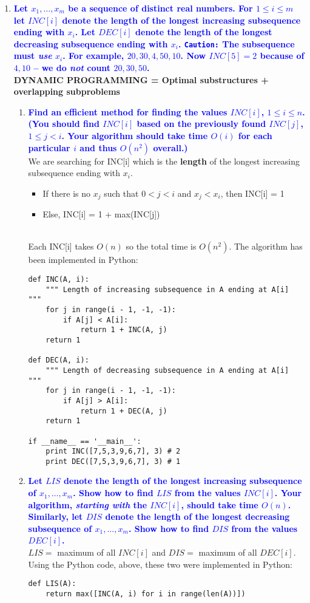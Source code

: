 \documentclass[11pt]{article}
\begin{document}
\begin{enumerate}
    
\item \textbf{\textcolor{blue}{Let $x_1,\ldots,x_m$ be a sequence of distinct real numbers. For $1\leq i\leq m$ let $INC[i]$ denote the length of the longest
increasing subsequence ending with $x_i$.  Let $DEC[i]$ denote the 
length of the longest decreasing subsequence ending with $x_i$.  
{\tt Caution:} The subsequence must {\em use} $x_i$.  For example,
$20,30,4,50, 10$.  Now $INC[5]=2$ because of $4,10$ -- we do
{\em not} count $20,30,50$.}}
    \\ \textbf{DYNAMIC PROGRAMMING = Optimal substructures + overlapping subproblems}
    \begin{enumerate}
    \item \textbf{\textcolor{blue}{Find an efficient method for finding the values $INC[i]$, $1\leq i\leq n$. (You should find $INC[i]$ based on the previously found $INC[j]$, $1\leq j< i$.  Your algorithm should take time $O(i)$ for each
    particular $i$ and thus $O(n^2)$ overall.)}}
        \\ We are searching for INC[i] which is the \textbf{length} of the longest increasing subsequence ending with $x_i$.
        \begin{itemize}
            \item If there is no $x_j$ such that $0 < j < i$ and $x_j < x_i$, then INC[i] = 1
            \item Else, INC[i] = 1 + max(INC[j])
        \end{itemize}
        \\ Each INC[i] takes $O(n)$ so the total time is $O(n^2)$. The algorithm has been implemented in Python:
        \begin{verbatim}
def INC(A, i):
    """ Length of increasing subsequence in A ending at A[i] """
    for j in range(i - 1, -1, -1):
        if A[j] < A[i]:
            return 1 + INC(A, j)
    return 1

def DEC(A, i):
    """ Length of decreasing subsequence in A ending at A[i] """
    for j in range(i - 1, -1, -1):
        if A[j] > A[i]:
            return 1 + DEC(A, j)
    return 1

if __name__ == '__main__':
    print INC([7,5,3,9,6,7], 3) # 2
    print DEC([7,5,3,9,6,7], 3) # 1
        \end{verbatim}

    \item \textbf{\textcolor{blue}{Let $LIS$ denote the length of the longest increasing subsequence of $x_1,\ldots,x_m$.  Show how to find $LIS$ from
    the values $INC[i]$. Your algorithm, {\em starting with} the $INC[i]$,
    should take time $O(n)$. Similarly, let $DIS$ denote the length of the longest
    decreasing subsequence of $x_1,\ldots,x_m$.  Show how to find $DIS$ from
    the values $DEC[i]$. }}
        \\ $LIS =$ maximum of all $INC[i]$ and $DIS =$ maximum of all $DEC[i]$.
        \\ Using the Python code, above, these two were implemented in Python:
        \begin{verbatim}
def LIS(A):
    return max([INC(A, i) for i in range(len(A))])


\end{verbatim}
\end{enumerate}
\end{enumerate}
\end{document}
